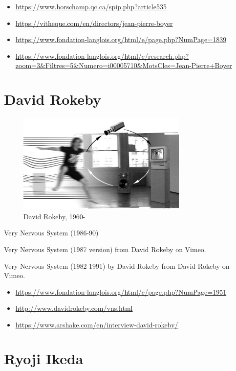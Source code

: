 \documentclass[
]{book}
\providecommand{\tightlist}{%
  \setlength{\itemsep}{0pt}\setlength{\parskip}{0pt}}
\begin{document}
\begin{itemize}
\tightlist
\item
  \url{https://www.horschamp.qc.ca/spip.php?article535}
\item
  \url{https://vitheque.com/en/directors/jean-pierre-boyer}
\item
  \url{https://www.fondation-langlois.org/html/e/page.php?NumPage=1839}
\item
  \url{https://www.fondation-langlois.org/html/e/research.php?zoom=3\&Filtres=5\&Numero=i00005710\&MotsCles=Jean-Pierre+Boyer}
\end{itemize}

\hypertarget{david-rokeby}{%
\section{David Rokeby}\label{david-rokeby}}

\begin{figure}
\centering
\includegraphics[width=0.75\textwidth,height=\textheight]{medias/corpus/rokeby/d00004229-wide.jpg}
\caption{David Rokeby, 1960-}
\end{figure}

Very Nervous System (1986-90)

Very Nervous System (1987 version) from David Rokeby on Vimeo.

Very Nervous System (1982-1991) by David Rokeby from David Rokeby on Vimeo.

\begin{itemize}
\tightlist
\item
  \url{https://www.fondation-langlois.org/html/e/page.php?NumPage=1951}
\item
  \url{http://www.davidrokeby.com/vns.html}
\item
  \url{https://www.arshake.com/en/interview-david-rokeby/}
\end{itemize}

\hypertarget{ryoji-ikeda}{%
\section{Ryoji Ikeda}\label{ryoji-ikeda}}
\end{document}
